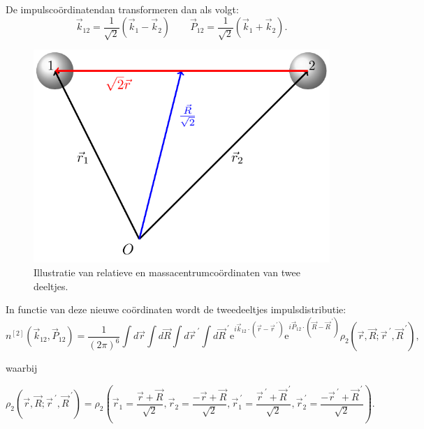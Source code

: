 \documentclass[11pt,twoside]{book}
\begin{document}
De impulsco\"{o}rdinatendan transformeren dan als volgt:
\begin{equation} \label{eq:rcm_impusl}
\vec{k}_{12}= \frac{1}{\sqrt{2}} \left(\vec{k}_1 - \vec{k}_2\right) \qquad \vec{P}_{12}= \frac{1}{\sqrt{2}} \left(\vec{k}_1 + \vec{k}_2\right).
\end{equation}
\begin{figure}[H]
\centering
\includegraphics[scale=0.7]{./figuren/jacobi.pdf}
\caption{ Illustratie van relatieve en massacentrumco\"{o}rdinaten van twee deeltjes.}
\label{fig:coordinates}
\end{figure}
In functie van deze nieuwe co\"{o}rdinaten wordt de tweedeeltjes impulsdistributie:
\begin{equation} \label{eq:twobodydist}
n^{[2]}(\vec{k}_{12},\vec{P}_{12})=\frac{1}{(2\pi)^6}
						\int d\vec{r} \int d\vec{R} \int d\vec{r}^{\ \prime} \int d\vec{R}^{\ \prime} 
    						\mathrm{e}^{i\vec{k}_{12}\cdot (\vec{r}-\vec{r}^{\ \prime})} 
    						\mathrm{e}^{i\vec{P}_{12}\cdot(\vec{R}-\vec{R}^{\ \prime})} 
    						\rho_2(\vec{r},\vec{R}; \vec{r}^{\ \prime},\vec{R}^{\ \prime}),
\end{equation}

waarbij

\begin{equation} \label{eq:twobodydensity}
\rho_2(\vec{r},\vec{R}; \vec{r}^{\ \prime},\vec{R}^{\ \prime}) = 
							\rho_2\left(	
							\vec{r}_1=\frac{\vec{r} + \vec{R}}{\sqrt{2}},
							\vec{r}_2=\frac{-\vec{r} + \vec{R}}{\sqrt{2}},
						    \vec{r}_1^{\ \prime}=\frac{\vec{r}^{\ \prime} + \vec{R}^{\ \prime}}{\sqrt{2}},	
						    \vec{r}_2^{\ \prime}=\frac{-\vec{r}^{\ \prime} + \vec{R}^{\ \prime}}{\sqrt{2}}
						    \right).
\end{equation}
\end{document}
